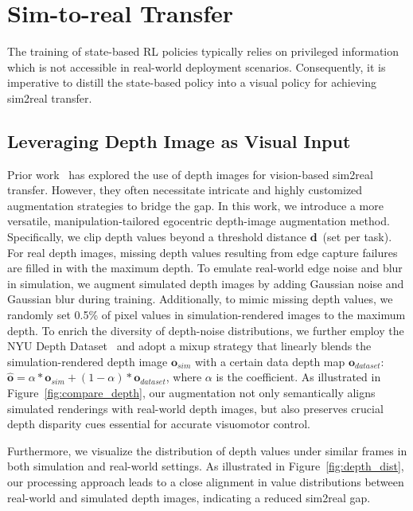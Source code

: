 \section{Sim-to-real Transfer}
The training of state-based RL policies typically relies on privileged information which is not accessible in real-world deployment scenarios. Consequently, it is imperative to distill the state-based policy into a visual policy for achieving sim2real transfer. 






\subsection{Leveraging Depth Image as Visual Input}
Prior work~\cite{lumdextrah,zhuang2023robot,zhuanghumanoid,rudin2025parkour} has explored the use of depth images
for vision-based sim2real transfer. However, they often necessitate intricate and highly customized augmentation strategies to bridge the gap. In this work, we introduce a more versatile, manipulation-tailored egocentric depth-image augmentation method. Specifically, we clip depth values beyond a threshold distance $\mathbf{d}$~(set per task). For real depth images, missing depth values resulting from edge capture failures are filled in with the maximum depth. To emulate real-world edge noise and blur in simulation, we augment simulated depth images by adding Gaussian noise and Gaussian blur during training. Additionally, to mimic missing depth values, we randomly set 0.5\% of pixel values in simulation-rendered images to the maximum depth. To enrich the diversity of depth-noise distributions, we further employ the NYU Depth Dataset~\cite{silberman2012indoor} and adopt a mixup strategy that linearly blends the simulation-rendered depth image $\boldsymbol{o}_{sim}$ with a certain data depth map $\boldsymbol{o}_{dataset}$: ${\boldsymbol{\hat{o}}} = \alpha*\boldsymbol{o}_{sim} + (1 - \alpha)*\boldsymbol{o}_{dataset}$, where $\alpha$ is the coefficient. As illustrated in Figure~\ref{fig:compare_depth}, our augmentation  not only semantically aligns simulated renderings with real-world depth images, but also preserves crucial depth disparity cues essential for accurate visuomotor control. 

Furthermore, we visualize the distribution of depth values under similar frames in both simulation and real-world settings. As illustrated in Figure~\ref{fig:depth_dist}, our processing approach leads to a close alignment in value distributions between real-world and simulated depth images, indicating a reduced sim2real gap. 





